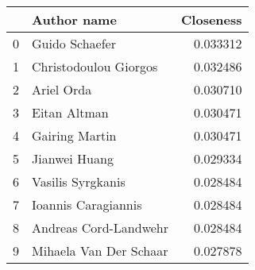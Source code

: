 \begin{tabular}{llr}
\toprule
{} &              Author name &  Closeness \\
\midrule
0 &           Guido Schaefer &   0.033312 \\
1 &   Christodoulou  Giorgos &   0.032486 \\
2 &               Ariel Orda &   0.030710 \\
3 &             Eitan Altman &   0.030471 \\
4 &          Gairing  Martin &   0.030471 \\
5 &            Jianwei Huang &   0.029334 \\
6 &        Vasilis Syrgkanis &   0.028484 \\
7 &      Ioannis Caragiannis &   0.028484 \\
8 &    Andreas Cord-Landwehr &   0.028484 \\
9 &   Mihaela Van Der Schaar &   0.027878 \\
\bottomrule
\end{tabular}
